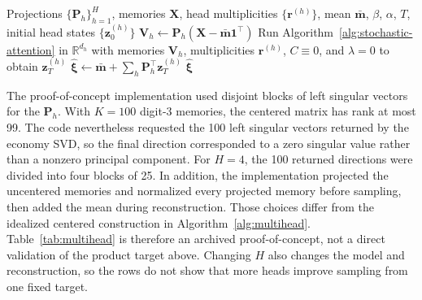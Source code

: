 \begin{algorithm}[H]
\caption{Independent-head Stochastic Attention}
\label{alg:multihead}
\begin{algorithmic}[1]
\REQUIRE Projections $\{\mathbf P_h\}_{h=1}^H$, memories $\mathbf X$,
head multiplicities $\{\mathbf r^{(h)}\}$, mean $\bar{\mathbf m}$, $\beta$,
$\alpha$, $T$, initial head states $\{\mathbf z_0^{(h)}\}$
\STATE $\mathbf V_h\leftarrow\mathbf P_h
(\mathbf X-\bar{\mathbf m}\mathbf1^\top)$
\STATE Run Algorithm~\ref{alg:stochastic-attention} in $\mathbb R^{d_h}$
with memories $\mathbf V_h$, multiplicities $\mathbf r^{(h)}$, $C\equiv0$,
and $\lambda=0$ to obtain $\mathbf z_T^{(h)}$
\ENDFOR
\STATE $\widehat{\boldsymbol\xi}\leftarrow\bar{\mathbf m}
+\sum_h\mathbf P_h^\top\mathbf z_T^{(h)}$
\RETURN $\widehat{\boldsymbol\xi}$
\end{algorithmic}
\end{algorithm}

The proof-of-concept implementation used disjoint blocks of left singular
vectors for the $\mathbf P_h$. With $K=100$ digit-3 memories, the centered
matrix has rank at most 99. The code nevertheless requested the 100 left
singular vectors returned by the economy SVD, so the final direction
corresponded to a zero singular value rather than a nonzero principal
component. For $H=4$, the 100 returned directions were divided into four blocks
of 25. In addition, the implementation projected the uncentered memories and
normalized every projected memory before sampling, then added the mean during
reconstruction. Those choices differ from the idealized centered construction
in Algorithm~\ref{alg:multihead}. Table~\ref{tab:multihead} is therefore an
archived proof-of-concept, not a direct validation of the product target above.
Changing $H$ also changes the model and reconstruction, so the rows do not show
that more heads improve sampling from one fixed target.

